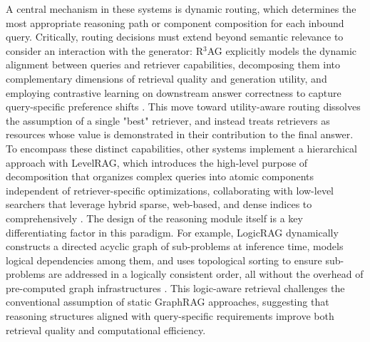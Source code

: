 \documentclass[11pt,a4paper]{article}
\begin{document}
A central mechanism in these systems is dynamic routing, which determines the most appropriate reasoning path or component composition for each inbound query. Critically, routing decisions must extend beyond semantic relevance to consider an interaction with the generator: R$^{3}$AG explicitly models the dynamic alignment between queries and retriever capabilities, decomposing them into complementary dimensions of retrieval quality and generation utility, and employing contrastive learning on downstream answer correctness to capture query-specific preference shifts \cite{arxiv:2410.20598v2}. This move toward utility-aware routing dissolves the assumption of a single "best" retriever, and instead treats retrievers as resources whose value is demonstrated in their contribution to the final answer. To encompass these distinct capabilities, other systems implement a hierarchical approach with LevelRAG, which introduces the high-level purpose of decomposition that organizes complex queries into atomic components independent of retriever-specific optimizations, collaborating with low-level searchers that leverage hybrid sparse, web-based, and dense indices to comprehensively \cite{arxiv:2502.18139v1}. The design of the reasoning module itself is a key differentiating factor in this paradigm. For example, LogicRAG dynamically constructs a directed acyclic graph of sub-problems at inference time, models logical dependencies among them, and uses topological sorting to ensure sub-problems are addressed in a logically consistent order, all without the overhead of pre-computed graph infrastructures \cite{arxiv:2508.06105v2}. This logic-aware retrieval challenges the conventional assumption of static GraphRAG approaches, suggesting that reasoning structures aligned with query-specific requirements improve both retrieval quality and computational efficiency.
\end{document}

